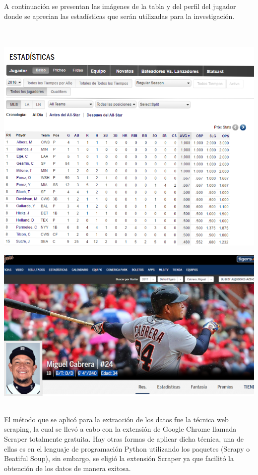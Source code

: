 \documentclass[11pt,letterpaper]{report}
\begin{document}
   A continuación se presentan las imágenes de la tabla y del perfil del jugador donde se aprecian las estadísticas que serán utilizadas para la investigación. \\
   \\
   \\
  \begin{center}
  	\includegraphics[scale=0.5]{vista.png} \\ \vspace{1.5cm}
  \end{center} 
  
  \begin{center}
     \includegraphics[scale=0.4]{2017.png}
  \end{center}
  \noindent \\ 
  
  
   El método que se aplicó para la extracción de los datos fue la técnica web scraping, la cual se llevó a cabo con la extensión de Google Chrome llamada Scraper totalmente gratuita. Hay otras formas de aplicar dicha técnica, una de ellas es en el lenguaje de programación Python utilizando los paquetes (Scrapy o Beatiful Soup), sin embargo, se eligió la extensión Scraper  ya que facilitó la obtención de los datos  de manera exitosa.\\ 
  
\end{document}
